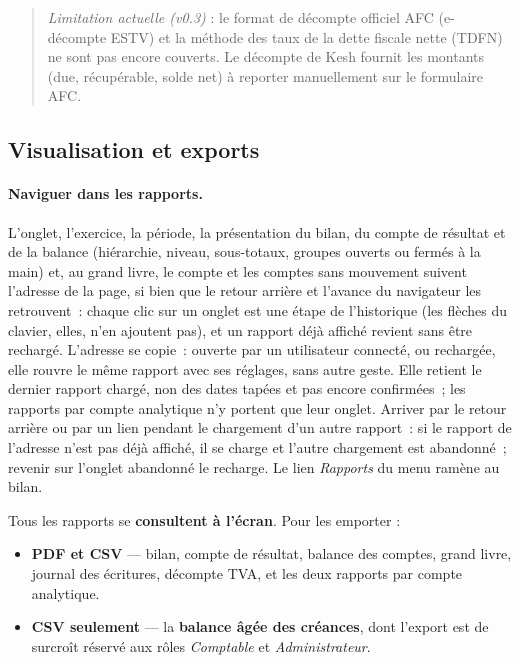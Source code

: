 \documentclass[a4paper,11pt,oneside]{article}
\begin{document}
\begin{quote}
\small \emph{Limitation actuelle (v0.3)} : le format de décompte officiel AFC (e-décompte ESTV) et la méthode des taux de la dette fiscale nette (TDFN) ne sont pas encore couverts. Le décompte de Kesh fournit les montants (due, récupérable, solde net) à reporter manuellement sur le formulaire AFC.
\end{quote}

\subsection{Visualisation et exports}\label{sec:rapports-exports}

\paragraph{Naviguer dans les rapports.} L'onglet, l'exercice, la période, la présentation du bilan, du compte de
résultat et de la balance (hiérarchie, niveau, sous-totaux, groupes ouverts ou fermés à la main) et, au grand
livre, le compte et les comptes sans mouvement suivent l'adresse de la page, si bien que le retour arrière et l'avance du navigateur les
retrouvent~: chaque clic sur un onglet est une étape de l'historique (les flèches du clavier, elles, n'en ajoutent
pas), et un rapport déjà affiché revient sans être rechargé. L'adresse se copie~: ouverte par un utilisateur
connecté, ou rechargée, elle rouvre le même rapport avec ses réglages, sans autre geste. Elle retient le dernier
rapport chargé, non des dates tapées et pas encore confirmées~; les rapports par compte analytique n'y portent
que leur onglet. Arriver par le retour arrière ou par un lien pendant le chargement d'un autre rapport~: si le
rapport de l'adresse n'est pas déjà affiché, il se charge et l'autre chargement est abandonné~; revenir sur
l'onglet abandonné le recharge. Le lien \emph{Rapports}
du menu ramène au bilan.

Tous les rapports se \textbf{consultent à l'écran}. Pour les emporter :

\begin{itemize}
    \item \textbf{PDF et CSV} — bilan, compte de résultat, balance des comptes, grand livre,
          journal des écritures, décompte TVA, et les deux rapports par compte analytique.
    \item \textbf{CSV seulement} — la \textbf{balance âgée des créances}, dont l'export est de
          surcroît réservé aux rôles \emph{Comptable} et \emph{Administrateur}.
\end{itemize}
\end{document}
